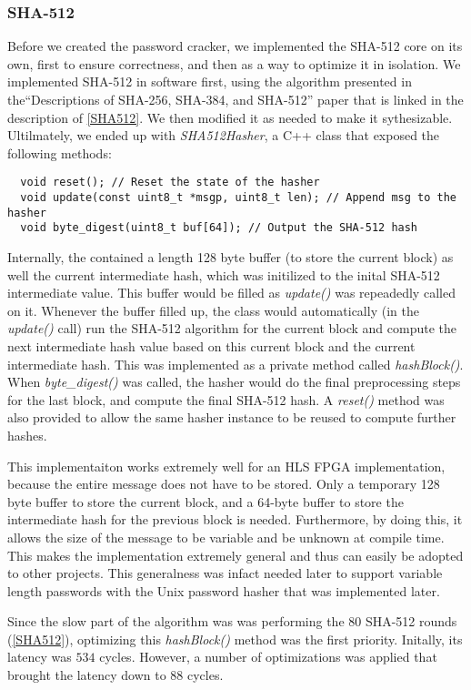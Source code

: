 \subsubsection{SHA-512}
Before we created the password cracker, we implemented the SHA-512 core on its own, first to ensure
correctness, and then as a way to optimize it in isolation. We implemented SHA-512 in software first,
using the algorithm presented in the``Descriptions of SHA-256, SHA-384, and SHA-512'' paper that is linked
in the description of \ref{SHA512}. We then modified it as needed to make it
sythesizable. Ultilmately, we ended up with \emph{SHA512Hasher}, a C++ class that exposed the following methods:
\begin{verbatim}
  void reset(); // Reset the state of the hasher
  void update(const uint8_t *msgp, uint8_t len); // Append msg to the hasher
  void byte_digest(uint8_t buf[64]); // Output the SHA-512 hash
\end{verbatim}

Internally, the contained a length 128 byte buffer (to store the current block)
as well the current intermediate hash,
which was initilized to the inital SHA-512 intermediate value. This buffer would be filled as
\emph{update()} was repeadedly called on it. Whenever the buffer filled up, the class would
automatically (in the \emph{update()} call) run the SHA-512 algorithm for the current block
and compute the next intermediate hash value based on this current block and the current intermediate hash.
This was implemented as a private method called \emph{hashBlock()}.
When \emph{byte\_digest()} was called, the hasher would do the final preprocessing steps for the last block,
and compute the final SHA-512 hash. A \emph{reset()} method was also provided to allow the same hasher
instance to be reused to compute further hashes.


This implementaiton works extremely well for an HLS FPGA implementation, because
the entire message does not have to be stored. Only a temporary 128 byte buffer
to store the current block, and a 64-byte buffer to store the intermediate hash for the previous block is needed.
Furthermore, by doing this, it allows the size of the message to be variable and be unknown at compile time.
This makes the implementation extremely general and thus can easily be adopted to
other projects. This generalness was infact needed later to support variable length passwords with the Unix password
hasher that was implemented later.

Since the slow part of the algorithm was was performing the 80 SHA-512 rounds (\ref{SHA512}),
optimizing this \emph{hashBlock()} method was the first priority. Initally, its
latency was $534$ cycles. However, a number of optimizations was applied that
brought the latency down to $88$ cycles.

